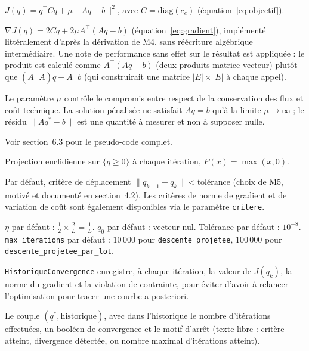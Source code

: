 \documentclass[11pt,a4paper]{article}
\begin{document}
\begin{description}[style=nextline]
  \item[Fonction objectif] $J(q) = q^\top C q + \mu \lVert Aq - b
  \rVert^2$, avec $C = \mathrm{diag}(c_e)$ (équation~\eqref{eq:objectif}).
  \item[Gradient] $\nabla J(q) = 2Cq + 2\mu A^\top(Aq - b)$
  (équation~\eqref{eq:gradient}), implémenté littéralement d'après la
  dérivation de M4, sans réécriture algébrique intermédiaire. Une note de
  performance sans effet sur le résultat est appliquée : le produit est
  calculé comme $A^\top(Aq - b)$ (deux produits matrice-vecteur) plutôt que
  $(A^\top A)q - A^\top b$ (qui construirait une matrice $|E| \times |E|$ à
  chaque appel).
  \item[Pénalisation] Le paramètre $\mu$ contrôle le compromis entre respect
  de la conservation des flux et coût technique. La solution pénalisée ne
  satisfait $Aq = b$ qu'à la limite $\mu \to \infty$ ; le résidu $\lVert Aq^*
  - b \rVert$ est une quantité à mesurer et non à supposer nulle.
  \item[Descente de gradient] Voir section~6.3 pour le pseudo-code complet.
  \item[Projection] Projection euclidienne sur $\{q \geq 0\}$ à chaque
  itération, $P(x) = \max(x, 0)$.
  \item[Critère d'arrêt] Par défaut, critère de déplacement $\lVert q_{k+1}
  - q_k \rVert < \text{tolérance}$ (choix de M5, motivé et documenté en
  section~4.2). Les critères de norme de gradient et de variation de coût
  sont également disponibles via le paramètre \texttt{critere}.
  \item[Gestion des paramètres] $\eta$ par défaut : $\tfrac{1}{2} \times
  \tfrac{2}{L}= \tfrac{1}{L}$. $q_0$ par défaut : vecteur nul. Tolérance par
  défaut : $10^{-8}$. \texttt{max\_iterations} par défaut : $10\,000$ pour
  \texttt{descente\_projetee}, $100\,000$ pour
  \texttt{descente\_projetee\_par\_lot}.
  \item[Suivi de la convergence] \texttt{HistoriqueConvergence} enregistre,
  à chaque itération, la valeur de $J(q_k)$, la norme du gradient et la
  violation de contrainte, pour éviter d'avoir à relancer l'optimisation
  pour tracer une courbe a posteriori.
  \item[Résultats retournés] Le couple $(q^*, \text{historique})$, avec dans
  l'historique le nombre d'itérations effectuées, un booléen de convergence
  et le motif d'arrêt (texte libre : critère atteint, divergence détectée,
  ou nombre maximal d'itérations atteint).
\end{description}
\end{document}

